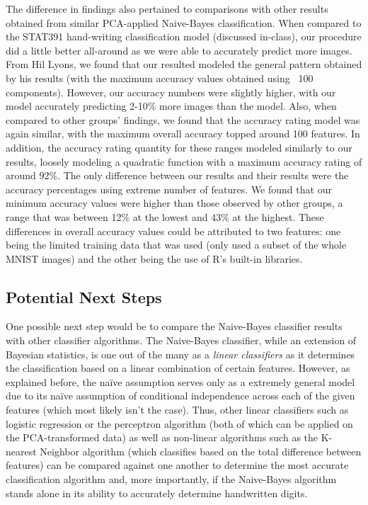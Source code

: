 \documentclass[twocolumn]{article}
\begin{document}
The difference in findings also pertained to comparisons with other results obtained from similar PCA-applied Naive-Bayes classification. When compared to the STAT391 hand-writing classification model (discussed in-class), our procedure did a little better all-around as we were able to accurately predict more images. From Hil Lyons, we found that our resulted modeled the general pattern obtained by his results (with the maximum accuracy values obtained using ~100 components). However, our accuracy numbers were slightly higher, with our model accurately predicting 2-10\% more images than the model. Also, when compared to other groups' findings, we found that the accuracy rating model was again similar, with the maximum overall accuracy topped around 100 features. In addition, the accuracy rating quantity for these ranges modeled similarly to our results, loosely modeling a quadratic function with a maximum accuracy rating of around 92\%. The only difference between our results and their results were the accuracy percentages using extreme number of features. We found that our minimum accuracy values were higher than those observed by other groups, a range that was between 12\% at the lowest and 43\% at the highest. These differences in overall accuracy values could be attributed to two features: one being the limited training data that was used (only used a subset of the whole MNIST images) and the other being the use of R's built-in libraries.

\subsection{Potential Next Steps}
\label{subsec:next steps}

One possible next step would be to compare the Naive-Bayes classifier results with other classifier algorithms. The Naive-Bayes classifier, while an extension of Bayesian statistics, is one out of the many as a \emph{linear classifiers} as it determines the classification based on a linear combination of certain features. However, as explained before, the naïve assumption serves only as a extremely general model due to its naïve assumption of conditional independence across each of the given features (which most likely isn't the case). Thus, other linear classifiers such as logistic regression or the perceptron algorithm (both of which can be applied on the PCA-transformed data) as well as non-linear algorithms such as the K-nearest Neighbor algorithm (which classifies based on the total difference between features) can be compared against one another to determine the most accurate classification algorithm and, more importantly, if the Naive-Bayes algorithm stands alone in its ability to accurately determine handwritten digits.
\end{document}
